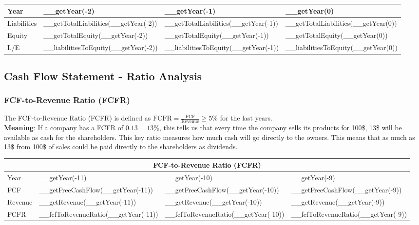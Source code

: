 \begin{tabularx}{\textwidth}{|X|X|X|X|}
 \hline
 Year                     & __getYear(-2)                        & __getYear(-1)                        & __getYear(0)                        \\
 \hline
 Liabilities              & __getTotalLiabilities(__getYear(-2)) & __getTotalLiabilities(__getYear(-1)) & __getTotalLiabilities(__getYear(0)) \\
 Equity                   & __getTotalEquity(__getYear(-2))      & __getTotalEquity(__getYear(-1))      & __getTotalEquity(__getYear(0))      \\
 \rowcolor{lightgray} L/E & __liabilitiesToEquity(__getYear(-2)) & __liabilitiesToEquity(__getYear(-1)) & __liabilitiesToEquity(__getYear(0)) \\
 \hline
\end{tabularx}

\subsection{Cash Flow Statement - Ratio Analysis}

\subsubsection{FCF-to-Revenue Ratio (FCFR)}

The FCF-to-Revenue Ratio (FCFR) is defined as
$\text{FCFR} = \frac{\text{FCF}}{\text{Revenue}} \geq 5\%$ for the last years.\\
\textbf{Meaning}: If a company has a FCFR of $0.13 = 13\%$, this tells us that
every time the company sells its products for 100\$, 13\$ will be available as
cash for the shareholders. This key ratio measures how much cash will go directly
to the owners. This means that as much as 13\$ from 100\$ of sales could be paid
directly to the shareholders as dividends.\\

\begin{tabularx}{\textwidth}{|X|X|X|X|}
 \hline
 \multicolumn{4}{|c|}{FCF-to-Revenue Ratio (FCFR)} \\
 \hline
 Year                       & __getYear(-11)                      & __getYear(-10)                      & __getYear(-9)                      \\
 \hline
 FCF                        & __getFreeCashFlow(__getYear(-11))   & __getFreeCashFlow(__getYear(-10))   & __getFreeCashFlow(__getYear(-9))   \\
 Revenue                    & __getRevenue(__getYear(-11))        & __getRevenue(__getYear(-10))        & __getRevenue(__getYear(-9))        \\
 \rowcolor{lightgray} FCFR  & __fcfToRevenueRatio(__getYear(-11)) & __fcfToRevenueRatio(__getYear(-10)) & __fcfToRevenueRatio(__getYear(-9)) \\
 \hline
\end{tabularx}\\


